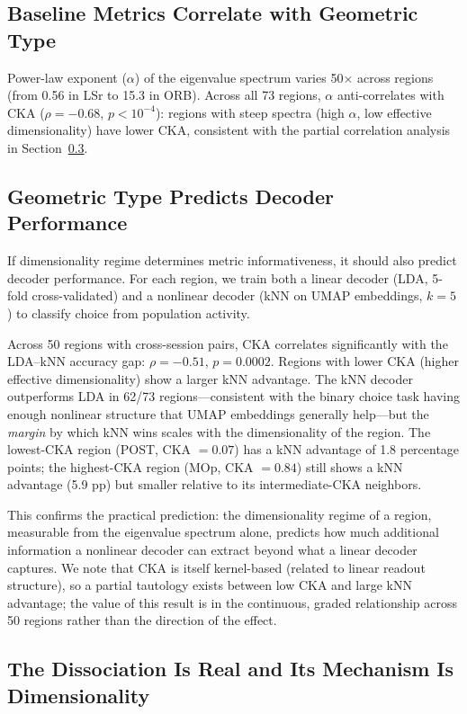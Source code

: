 \documentclass{article}
\begin{document}
\subsection{Baseline Metrics Correlate with Geometric Type}

Power-law exponent ($\alpha$) of the eigenvalue spectrum varies 50$\times$ across regions (from 0.56 in LSr to 15.3 in ORB). Across all 73 regions, $\alpha$ anti-correlates with CKA ($\rho = -0.68$, $p < 10^{-4}$): regions with steep spectra (high $\alpha$, low effective dimensionality) have lower CKA, consistent with the partial correlation analysis in Section~\ref{sec:mechanism}.

\subsection{Geometric Type Predicts Decoder Performance}

If dimensionality regime determines metric informativeness, it should also predict decoder performance. For each region, we train both a linear decoder (LDA, 5-fold cross-validated) and a nonlinear decoder (kNN on UMAP embeddings, $k = 5$) to classify choice from population activity.

Across 50 regions with cross-session pairs, CKA correlates significantly with the LDA--kNN accuracy gap: $\rho = -0.51$, $p = 0.0002$. Regions with lower CKA (higher effective dimensionality) show a larger kNN advantage. The kNN decoder outperforms LDA in 62/73 regions---consistent with the binary choice task having enough nonlinear structure that UMAP embeddings generally help---but the \emph{margin} by which kNN wins scales with the dimensionality of the region. The lowest-CKA region (POST, CKA $= 0.07$) has a kNN advantage of 1.8 percentage points; the highest-CKA region (MOp, CKA $= 0.84$) still shows a kNN advantage (5.9 pp) but smaller relative to its intermediate-CKA neighbors.

This confirms the practical prediction: the dimensionality regime of a region, measurable from the eigenvalue spectrum alone, predicts how much additional information a nonlinear decoder can extract beyond what a linear decoder captures. We note that CKA is itself kernel-based (related to linear readout structure), so a partial tautology exists between low CKA and large kNN advantage; the value of this result is in the continuous, graded relationship across 50 regions rather than the direction of the effect.

\subsection{The Dissociation Is Real and Its Mechanism Is Dimensionality}
\label{sec:mechanism}
\end{document}
